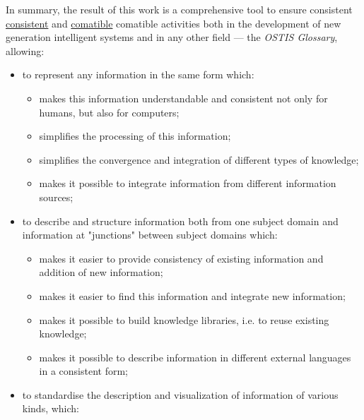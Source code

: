 \documentclass[12pt,a4paper]{scndocument}
\begin{document}
\begin{multicols}{2}
In summary, the result of this work is a comprehensive
tool to ensure consistent \underline{consistent} and \underline{comatible} comatible activities both in
the development of new generation intelligent systems
and in any other field — the \textit{OSTIS Glossary}, allowing:
\begin{itemize}
    \item to represent any information in the same form which:
    \begin{itemize}
        \item makes this information understandable and consistent not only for humans, but also for computers;
        \item simplifies the processing of this information;
        \item simplifies the convergence and integration of different types of knowledge;
        \item makes it possible to integrate information from different information sources;
    \end{itemize}
    \item to describe and structure information both from one subject domain and information at "junctions" between subject domains which:
    \begin{itemize}
        \item makes it easier to provide consistency of existing information and addition of new information;
        \item makes it easier to find this information and integrate new information;
        \item makes it possible to build knowledge libraries, i.e. to reuse existing knowledge;
        \item makes it possible to describe information in different external languages in a consistent form;
    \end{itemize}
    \item to standardise the description and visualization of information of various kinds, which:
\end{itemize}
\newpage

\end{multicols}
\end{document}
